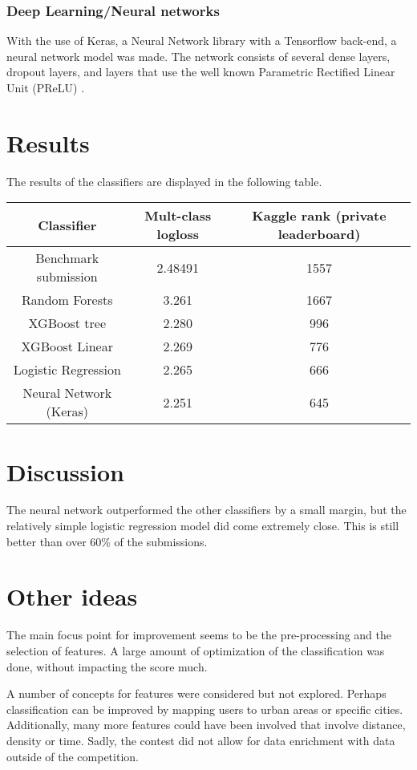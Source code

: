 \documentclass[runningheads,a4paper]{llncs}
\begin{document}
\subsubsection{Deep Learning/Neural networks}
With the use of Keras, a Neural Network library with a Tensorflow back-end, a neural network model was made. The network consists of several dense layers, dropout layers, and layers that use the well known Parametric Rectified Linear Unit (PReLU) \cite{PReLU}. 


\section{Results}
The results of the classifiers are displayed in the following table. 

\begin{center}
    \begin{tabular}{| c | c | c|}
    \hline 
    Classifier & Mult-class logloss &  Kaggle rank (private leaderboard)\\ \hline
    Benchmark submission & 2.48491 & 1557 \\ \hline
    Random Forests & 3.261 & 1667 \\ \hline
    XGBoost tree & 2.280 & 996 \\ \hline
    XGBoost Linear & 2.269 & 776 \\ \hline
    Logistic Regression & 2.265 & 666 \\ \hline
    Neural Network (Keras) & 2.251 & 645 \\ \hline
    \end{tabular}
\end{center}

\section{Discussion}
The neural network outperformed the other classifiers by a small margin, but the relatively simple logistic regression model did come extremely close. This is still better than over 60\% of the submissions. 

\section{Other ideas}
The main focus point for improvement seems to be the pre-processing and the selection of features. A large amount of optimization of the classification was done, without impacting the score much.

A number of concepts for features were considered but not explored. Perhaps classification can be improved by mapping users to urban areas or specific cities. Additionally, many more features could have been involved that involve distance, density or time. Sadly, the contest did not allow for data enrichment with data outside of the competition.
\end{document}
